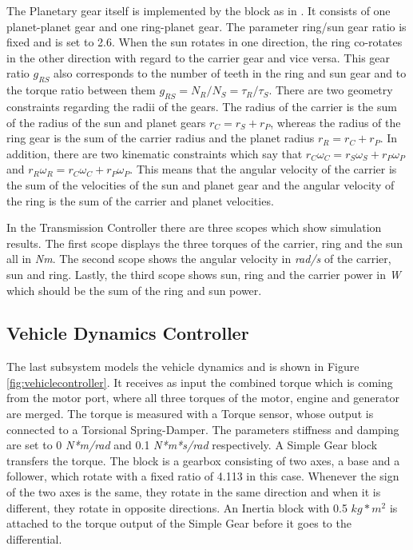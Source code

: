 The Planetary gear itself is implemented by the block as in \citet{planetMatlab}. It consists of one planet-planet gear and one ring-planet gear. The parameter ring/sun gear ratio is fixed and is set to 2.6. When the sun rotates in one direction, the ring co-rotates in the other direction with regard to the carrier gear and vice versa. This gear ratio $g_{RS}$ also corresponds to the number of teeth in the ring and sun gear and to the torque ratio between them $g_{RS} = N_R/N_S = \tau_R/\tau_S$. There are two geometry constraints regarding the radii of the gears. The radius of the carrier is the sum of the radius of the sun and planet gears $r_C = r_S + r_P$, whereas the radius of the ring gear is the sum of the carrier radius and the planet radius $r_R = r_C + r_P$. In addition, there are two kinematic constraints which say that $r_C\omega_C = r_S\omega_S + r_P\omega_P$ and $r_R\omega_R = r_C\omega_C + r_P\omega_P$. This means that the angular velocity of the carrier is the sum of the velocities of the sun and planet gear and the angular velocity of the ring is the sum of the carrier and planet velocities.

In the Transmission Controller there are three scopes which show simulation results. The first scope  displays the three torques of the carrier, ring and the sun all in \textit{Nm}. The second scope shows the angular velocity in \textit{rad/s} of the carrier, sun and ring. Lastly, the third scope shows sun, ring and the carrier power in \textit{W} which should be the sum of the ring and sun power.

\subsection{Vehicle Dynamics Controller}
The last subsystem models the vehicle dynamics and is shown in Figure \ref{fig:vehiclecontroller}. It receives as input the combined torque which is coming from the motor port, where all three torques of the motor, engine and generator are merged. The torque is measured with a Torque sensor, whose output is connected to a Torsional Spring-Damper. The parameters stiffness and damping are set to 0 \textit{N*m/rad} and 0.1 \textit{N*m*s/rad} respectively. A Simple Gear block \citep{simpleGearMatlab} transfers the torque. The block is a gearbox consisting of two axes, a base and a follower, which rotate with a fixed ratio of 4.113 in this case. Whenever the sign of the two axes is the same, they rotate in the same direction and when it is different, they rotate in opposite directions. An Inertia block with 0.5 $kg*m^2$ is attached to the torque output of the Simple Gear before it goes to the differential. 

